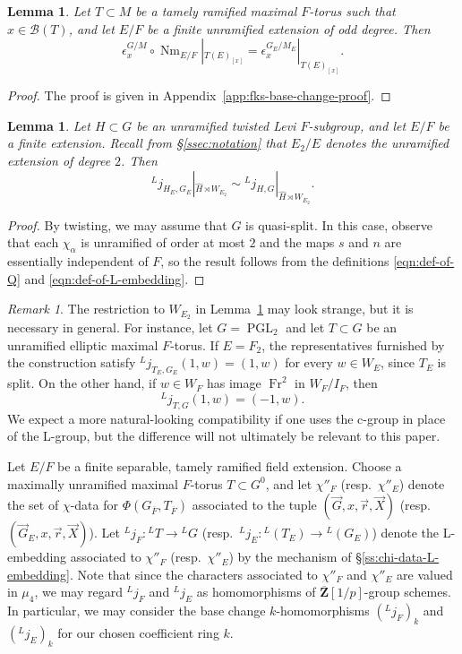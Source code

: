 \documentclass[reqno]{amsart}
\numberwithin{equation}{subsection}
\newcommand{\Z}{\mathbf{Z}}
\newcommand{\ol}[1]{\overline{#1}}
\newcommand{\wh}[1]{\widehat{#1}}
\newcommand{\co}{\colon}
\newcommand{\ld}{{}^L}
\newcommand\cB{\mathcal{B}}
\DeclareMathOperator{\PGL}{PGL}
\DeclareMathOperator{\Nm}{Nm}
\DeclareMathOperator{\Fr}{Fr}
\newtheorem{lemma}[thm]{Lemma}
\theoremstyle{remark}
\newtheorem{remark}[thm]{Remark}
\numberwithin{equation}{subsection}
\numberwithin{figure}{subsection}
\begin{document}
\begin{lemma}\label{lemma:fks-base-change}
Let $T \subset M$ be a tamely ramified maximal $F$-torus such that $x\in\cB(T)$, and let $E/F$ be a finite unramified extension of odd degree. Then
\[
\epsilon_x^{G/M} \circ \Nm_{E/F}|_{T(E)_{[x]}} = \epsilon_x^{G_E/M_E}|_{T(E)_{[x]}}.
\]
\end{lemma}



\begin{proof}
The proof is given in Appendix~\ref{app:fks-base-change-proof}.
\end{proof}

\begin{lemma}\label{lemma:canonical-l-embedding-base-change}
Let $H \subset G$ be an unramified twisted Levi $F$-subgroup, and let $E/F$ be a finite extension. Recall from \S\ref{ssec:notation} that $E_2/E$ denotes the unramified extension of degree $2$. Then
\[
\ld j_{H_E,G_E}|_{\wh H\rtimes W_{E_2}} \sim \ld j_{H,G}|_{\wh H\rtimes W_{E_2}}.
\]
\end{lemma}

\begin{proof}
By twisting, we may assume that $G$ is quasi-split. In this case, observe that each $\chi_\alpha$ is unramified of order at most $2$ and the maps $s$ and $n$ are essentially independent of $F$, so the result follows from the definitions \eqref{eqn:def-of-Q} and \eqref{eqn:def-of-L-embedding}.
\end{proof}

\begin{remark}\label{remark:canonical-embedding-incompatible}
The restriction to $W_{E_2}$ in Lemma~\ref{lemma:canonical-l-embedding-base-change} may look strange, but it is necessary in general. For instance, let $G=\PGL_2$ and let $T\subset G$ be an unramified elliptic maximal $F$-torus. If $E=F_2$, the representatives furnished by the construction satisfy $\ld j_{T_E,G_E}(1,w)=(1,w)$ for every $w\in W_E$, since $T_E$ is split. On the other hand, if $w\in W_F$ has image $\Fr^2$ in $W_F/I_F$, then
\[
\ld j_{T,G}(1,w)=(-1,w).
\]
We expect a more natural-looking compatibility if one uses the c-group in place of the L-group, but the difference will not ultimately be relevant to this paper.
\end{remark}

Let $E/F$ be a finite separable, tamely ramified field extension. Choose a maximally unramified maximal $F$-torus $T \subset G^0$, and let $\chi''_F$ (resp.\ $\chi''_E$) denote the set of $\chi$-data for $\Phi(G_{\ol F}, T_{\ol F})$ associated to the tuple $(\vec{G},x,\vec{r},\vec{X})$ (resp.\ $(\vec{G}_E,x,\vec{r},\vec{X})$). Let $\ld j_F\co \ld T \to \ld G$ (resp.\ $\ld j_E\co \ld(T_E) \to \ld(G_E)$) denote the L-embedding associated to $\chi''_F$ (resp.\ $\chi''_E$) by the mechanism of \S\ref{ss:chi-data-L-embedding}. Note that since the characters associated to $\chi''_F$ and $\chi''_E$ are valued in $\mu_4$, we may regard $\ld j_F$ and $\ld j_E$ as homomorphisms of $\ol\Z[1/p]$-group schemes. In particular, we may consider the base change $k$-homomorphisms $(\ld j_F)_k$ and $(\ld j_E)_k$ for our chosen coefficient ring $k$.
\end{document}
